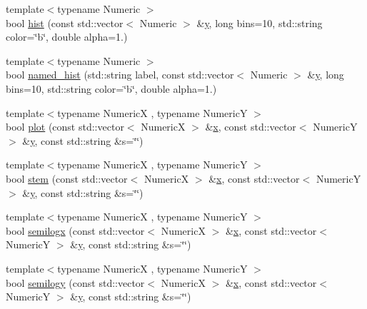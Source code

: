 \begin{DoxyCompactItemize}
{\footnotesize template$<$typename Numeric $>$ }\\bool \mbox{\hyperlink{namespacematplotlibcpp_ac0295119bc4ecb6cedd18509409eefd3}{hist}} (const std\+::vector$<$ Numeric $>$ \&\mbox{\hyperlink{plottingTest_8cpp_a64d0474b77956c0e971da1b6cb1ddacd}{y}}, long bins=10, std\+::string color=\char`\"{}b\char`\"{}, double alpha=1.)
\item 
{\footnotesize template$<$typename Numeric $>$ }\\bool \mbox{\hyperlink{namespacematplotlibcpp_a2851ef02b92b32ee7d3dd8f8fd065ae3}{named\+\_\+hist}} (std\+::string label, const std\+::vector$<$ Numeric $>$ \&\mbox{\hyperlink{plottingTest_8cpp_a64d0474b77956c0e971da1b6cb1ddacd}{y}}, long bins=10, std\+::string color=\char`\"{}b\char`\"{}, double alpha=1.)
\item 
{\footnotesize template$<$typename NumericX , typename NumericY $>$ }\\bool \mbox{\hyperlink{namespacematplotlibcpp_a19804a8cbd413b15c8d07848d7a5890e}{plot}} (const std\+::vector$<$ NumericX $>$ \&\mbox{\hyperlink{plottingTest_8cpp_aa0155849a1850c1edcfe7bce685b08f1}{x}}, const std\+::vector$<$ NumericY $>$ \&\mbox{\hyperlink{plottingTest_8cpp_a64d0474b77956c0e971da1b6cb1ddacd}{y}}, const std\+::string \&s=\char`\"{}\char`\"{})
\item 
{\footnotesize template$<$typename NumericX , typename NumericY $>$ }\\bool \mbox{\hyperlink{namespacematplotlibcpp_a02a1939d1d0b7b61878bd7cf2d8cd7f3}{stem}} (const std\+::vector$<$ NumericX $>$ \&\mbox{\hyperlink{plottingTest_8cpp_aa0155849a1850c1edcfe7bce685b08f1}{x}}, const std\+::vector$<$ NumericY $>$ \&\mbox{\hyperlink{plottingTest_8cpp_a64d0474b77956c0e971da1b6cb1ddacd}{y}}, const std\+::string \&s=\char`\"{}\char`\"{})
\item 
{\footnotesize template$<$typename NumericX , typename NumericY $>$ }\\bool \mbox{\hyperlink{namespacematplotlibcpp_ad25d4429577dbdd8c087a0ba6869840b}{semilogx}} (const std\+::vector$<$ NumericX $>$ \&\mbox{\hyperlink{plottingTest_8cpp_aa0155849a1850c1edcfe7bce685b08f1}{x}}, const std\+::vector$<$ NumericY $>$ \&\mbox{\hyperlink{plottingTest_8cpp_a64d0474b77956c0e971da1b6cb1ddacd}{y}}, const std\+::string \&s=\char`\"{}\char`\"{})
\item 
{\footnotesize template$<$typename NumericX , typename NumericY $>$ }\\bool \mbox{\hyperlink{namespacematplotlibcpp_a4dce9b4c1c16c1dab0cffd11588d4db8}{semilogy}} (const std\+::vector$<$ NumericX $>$ \&\mbox{\hyperlink{plottingTest_8cpp_aa0155849a1850c1edcfe7bce685b08f1}{x}}, const std\+::vector$<$ NumericY $>$ \&\mbox{\hyperlink{plottingTest_8cpp_a64d0474b77956c0e971da1b6cb1ddacd}{y}}, const std\+::string \&s=\char`\"{}\char`\"{})

\end{DoxyCompactItemize}
